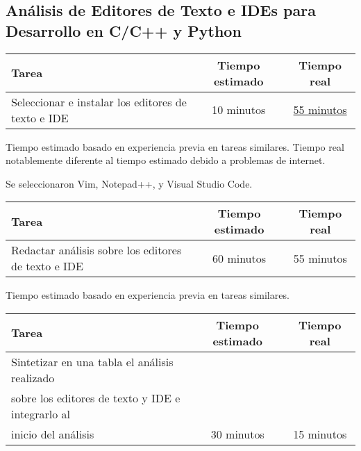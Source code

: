 \documentclass[12pt,a4paper]{article}
\begin{document}
\subsection{Análisis de Editores de Texto e IDEs para Desarrollo en C/C++ y Python}
    \begin{center}
        \begin{tabular}{|l|c|c|}
            \hline
            \textbf{Tarea} & \textbf{Tiempo estimado} & \textbf{Tiempo real} \\
            \hline
            Seleccionar e instalar los editores de texto e 
IDE & 10 minutos & \href{https://www.youtube.com/watch?v=DXzctTjb7DM}{55 minutos} \\
            \hline
        \end{tabular}
    \end{center}
    \begin{center}
        Tiempo estimado basado en experiencia previa en tareas similares.
        \newline
        Tiempo real notablemente diferente al tiempo estimado debido a problemas de internet.
    \end{center}
Se seleccionaron Vim, Notepad++, y Visual Studio Code.
    \begin{center}
        \begin{tabular}{|l|c|c|}
            \hline
            \textbf{Tarea} & \textbf{Tiempo estimado} & \textbf{Tiempo real} \\
            \hline
            Redactar análisis sobre los editores de texto e IDE & 60 minutos & 55 minutos \\
            \hline
        \end{tabular}
    \end{center}
    \begin{center}
        Tiempo estimado basado en experiencia previa en tareas similares.
    \end{center}
    \begin{center}
        \begin{tabular}{|l|c|c|}
            \hline
            \textbf{Tarea} & \textbf{Tiempo estimado} & \textbf{Tiempo real} \\
            \hline
            Sintetizar en una tabla el análisis realizado 
\\sobre los editores de texto y IDE e integrarlo al 
\\inicio del análisis & 30 minutos & 15 minutos \\
            \hline
        \end{tabular}
    \end{center}
\end{document}
